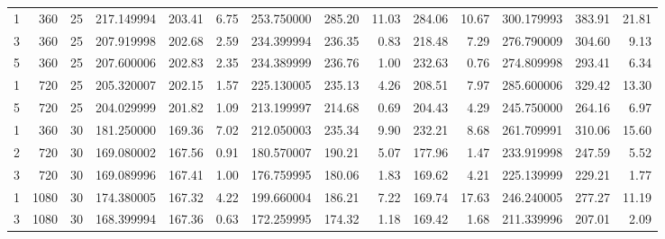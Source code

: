 \begin{tabular}{rrrrrrrrrrrrrr}
     1 &   360 &    25 &    217.149994 &     203.41 &            6.75 &     253.750000 &      285.20 &                11.03 &         284.06 &                   10.67 &    300.179993 &     383.91 &           21.81 \\
     3 &   360 &    25 &    207.919998 &     202.68 &            2.59 &     234.399994 &      236.35 &                 0.83 &         218.48 &                    7.29 &    276.790009 &     304.60 &            9.13 \\
     5 &   360 &    25 &    207.600006 &     202.83 &            2.35 &     234.389999 &      236.76 &                 1.00 &         232.63 &                    0.76 &    274.809998 &     293.41 &            6.34 \\
     1 &   720 &    25 &    205.320007 &     202.15 &            1.57 &     225.130005 &      235.13 &                 4.26 &         208.51 &                    7.97 &    285.600006 &     329.42 &           13.30 \\
     5 &   720 &    25 &    204.029999 &     201.82 &            1.09 &     213.199997 &      214.68 &                 0.69 &         204.43 &                    4.29 &    245.750000 &     264.16 &            6.97 \\
     1 &   360 &    30 &    181.250000 &     169.36 &            7.02 &     212.050003 &      235.34 &                 9.90 &         232.21 &                    8.68 &    261.709991 &     310.06 &           15.60 \\
     2 &   720 &    30 &    169.080002 &     167.56 &            0.91 &     180.570007 &      190.21 &                 5.07 &         177.96 &                    1.47 &    233.919998 &     247.59 &            5.52 \\
     3 &   720 &    30 &    169.089996 &     167.41 &            1.00 &     176.759995 &      180.06 &                 1.83 &         169.62 &                    4.21 &    225.139999 &     229.21 &            1.77 \\
     1 &  1080 &    30 &    174.380005 &     167.32 &            4.22 &     199.660004 &      186.21 &                 7.22 &         169.74 &                   17.63 &    246.240005 &     277.27 &           11.19 \\
     3 &  1080 &    30 &    168.399994 &     167.36 &            0.63 &     172.259995 &      174.32 &                 1.18 &         169.42 &                    1.68 &    211.339996 &     207.01 &            2.09 \\
\bottomrule
\end{tabular}
